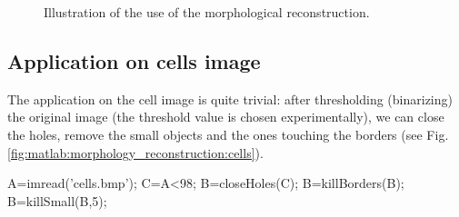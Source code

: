 \begin{figure}[htbp]
\centering

\hfill
{}\hfill
{}
\caption{Illustration of the use of the morphological reconstruction.}
\label{fig:matlab:morphology_reconstruction:rec_appli}
\end{figure}

\subsection{Application on cells image}
The application on the cell image is quite trivial: after thresholding (binarizing) the original image (the threshold value is chosen experimentally), we can close the holes, remove the small objects and the ones touching the borders (see Fig.\ref{fig:matlab:morphology_reconstruction:cells}).

\begin{matlab}
A=imread('cells.bmp');
C=A<98;
B=closeHoles(C);
B=killBorders(B);
B=killSmall(B,5);
\end{matlab}


